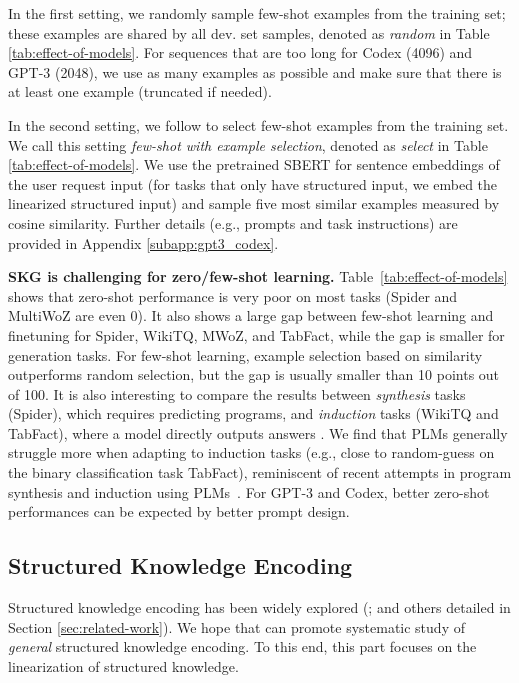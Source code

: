In the first setting, we randomly sample few-shot examples from the training set; these examples are shared by all dev. set samples, denoted as \textit{random} in Table \ref{tab:effect-of-models}. 
For sequences that are too long for Codex (4096) and GPT-3 (2048), we use as many examples as possible and make sure that there is at least one example (truncated if needed). 

In the second setting, we follow \citet{gao2021making} to select few-shot examples from the training set. 
We call this setting \textit{few-shot with example selection}, denoted as \textit{select} in Table \ref{tab:effect-of-models}. 
We use the pretrained SBERT \cite{reimers-2020-multilingual-sentence-bert} for sentence embeddings of the user request input (for tasks that only have structured input, we embed the linearized structured input) and sample five most similar examples measured by cosine similarity. Further details (e.g., prompts and task instructions) are provided in Appendix \ref{subapp:gpt3_codex}.

\noindent\textbf{SKG is challenging for zero/few-shot learning. }
Table~\ref{tab:effect-of-models} shows that zero-shot performance is very poor on most tasks (Spider and MultiWoZ are even 0). 
It also shows a large gap between few-shot learning and finetuning for Spider, WikiTQ, MWoZ, and TabFact, while the gap is smaller for generation tasks. 
For few-shot learning, example selection based on similarity outperforms random selection, but the gap is usually smaller than 10 points out of 100. 
It is also interesting to compare the results between \textit{synthesis} tasks (Spider), which requires predicting programs, and \textit{induction} tasks (WikiTQ and TabFact), where a model directly outputs answers \citep{Devlin2017RobustFillNP}. 
We find that PLMs generally struggle more when adapting to induction tasks (e.g., close to random-guess on the binary classification task TabFact), reminiscent of recent attempts in program synthesis and induction using PLMs~\citep{Austin2021ProgramSW}.
For GPT-3 and Codex, 
better zero-shot performances can be expected by better prompt design. 

\subsection{Structured Knowledge Encoding}
\label{subsec:structured-encoding-analysis}
Structured knowledge encoding has been widely explored (\citealp{Bogin2019GlobalRO,kagnet-emnlp19,agarwal2020knowledge,saxena2020improving,yasunaga2020graph,yasunaga2022dragon}; and others detailed in Section \ref{sec:related-work}). We hope that \uskg can promote systematic study of \textit{general} structured knowledge encoding. 
To this end, this part focuses on the linearization of structured knowledge. 

